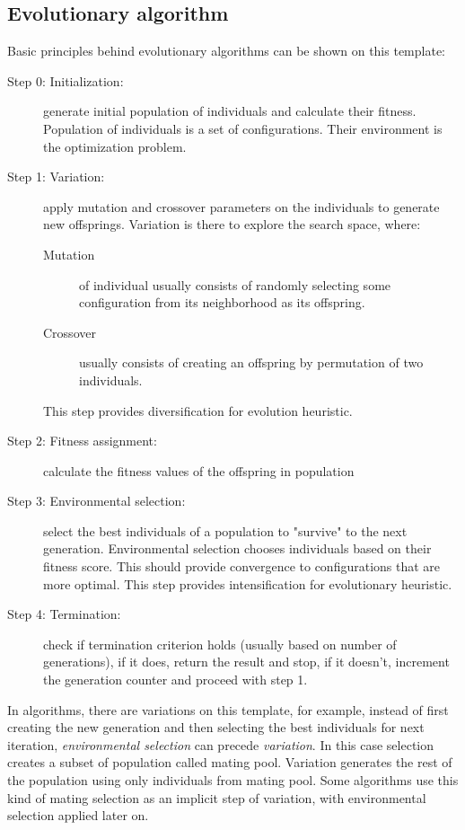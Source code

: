 \documentclass[12pt,oneside]{fithesis2}
\begin{document}
\subsection{Evolutionary algorithm}
Basic principles behind evolutionary algorithms can be shown on this template\cite{talbi2009metaheuristics}: 
\begin{description}
	\item[Step 0: Initialization:] generate initial population of individuals and calculate their fitness. Population of individuals is a set of configurations. Their environment is the optimization problem.
    \item[Step 1: Variation:] apply mutation and crossover parameters on the individuals to generate new offsprings. Variation is there to explore the search space, where: 
        \begin{description}
            \item[Mutation] of individual usually consists of randomly selecting some configuration from its neighborhood as its offspring.
            \item[Crossover] usually consists of creating an offspring by permutation of two individuals. 
        \end{description}
        This step provides diversification for evolution heuristic.
	\item[Step 2: Fitness assignment:] calculate the fitness values of the offspring in population
	\item[Step 3: Environmental selection:] select the best individuals of a population to "survive" to the next generation. Environmental selection chooses individuals based on their fitness score. This should provide convergence to configurations that are more optimal. This step provides intensification for evolutionary heuristic.
	\item[Step 4: Termination:] check if termination criterion holds (usually based on number of generations), if it does, return the result and stop, if it doesn't, increment the generation counter and proceed with step 1.
\end{description}

In algorithms, there are variations on this template, for example, instead of first creating the new generation and then selecting the best individuals for next iteration, \emph{environmental selection} can precede \emph{variation}. In this case selection creates a subset of population called mating pool. Variation generates the rest of the population using only individuals from mating pool. Some algorithms use this kind of mating selection as an implicit step of variation, with environmental selection applied later on. 
\end{document}

